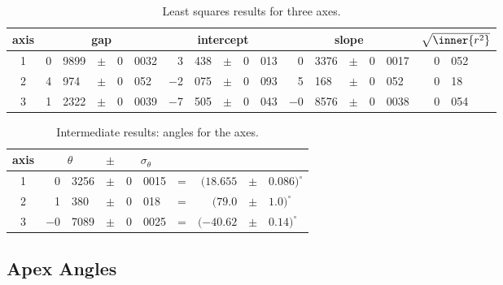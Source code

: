   \begin{table}[htbp]  %
    \caption{Least squares results for three axes.}
    \begin{center}
      \begin{tabular}{c r@{.}l c r@{.}l r@{.}l c r@{.}l r@{.}l c r@{.}l r@{.}l}
        axis & \multicolumn{5}{c}{gap} & \multicolumn{5}{c}{intercept} & \multicolumn{5}{c}{slope} & \multicolumn{2}{c}{$\sqrt{\inner{r^{2}}}$} \\\hline
        1 &  0 & 9899  & $\pm$ &  0 & 0032  & 3 & 438    & $\pm$ &  0 & 013  &  0 & 3376     & $\pm$ &  0 & 0017 & 0 & 052\\
        2 &  4 & 974   & $\pm$ &  0 & 052   & $-$2 & 075 & $\pm$ &  0 & 093  &  5 & 168      & $\pm$ &  0 & 052 & 0 & 18 \\
        3 &  1 & 2322  & $\pm$ &  0 & 0039  & $-$7 & 505 & $\pm$ &  0 & 043  &  $-$0 & 8576  & $\pm$ &  0 & 0038 & 0 & 054 \\
      \end{tabular}
    \end{center}
  \end{table}%

  \begin{table}[htbp]  %
    \caption{Intermediate results: angles for the axes.}
    \begin{center}
      \begin{tabular}{c r@{.}l c r@{.}l c rcl}
        axis & \multicolumn{2}{c}{$\theta$} & $\pm$ & \multicolumn{2}{c}{$\sigma_{\theta}$} \\\hline
        1 &   0 & 3256  & $\pm$ &  0 & 0015 & = & $(18.655$ & $\pm$ & $0.086)^{\circ}$\\
        2 &   1 & 380   & $\pm$ &  0 & 018  & = & $(79.0$ & $\pm$ & $1.0)^{\circ}$ \\
        3 & $-$0 & 7089  & $\pm$ &  0 & 0025 & = & $(-40.62$ & $\pm$ & $0.14)^{\circ}$
      \end{tabular}
    \end{center}
  \end{table}%

\subsection{Apex Angles}  %

